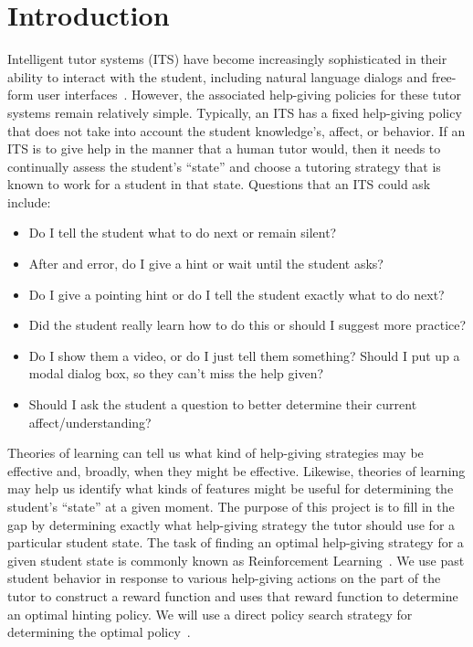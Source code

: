 \documentclass{edm_template}
\begin{document}
\section{Introduction}
 
Intelligent tutor systems (ITS) have become increasingly
sophisticated in their ability to interact with the student, including
natural language dialogs and free-form user interfaces~\cite{vanlehn_behavior_2006}.  However, the associated
help-giving policies for these tutor systems remain relatively simple.
Typically, an ITS has a fixed help-giving policy that does not take
into account the student knowledge's, affect, or behavior.
If an ITS is to give help in the manner that a human tutor would, then
it needs to continually assess the student's ``state'' and choose a tutoring strategy
that is known to work for a student in that state.
Questions that an ITS could ask include:
%
\label{intro}
\begin{itemize}

   \item Do I tell the student what to do next or remain silent?

   \item After and error, do I give a hint or wait until the student asks?

   \item Do I give a pointing hint or do I tell the student 
         exactly what to do next?

   \item Did the student really learn how to do this or should
         I suggest more practice?

   \item Do I show them a video, or do I just tell them something?
         Should I put up a modal dialog box, so they can't miss the
         help given?

   \item Should I ask the student a question to better determine their 
         current affect/understanding?

\end{itemize}

Theories of learning can tell us what kind of help-giving
strategies may be effective and, broadly, when they might be effective.
Likewise, theories of learning may help us identify what kinds of 
features might be useful for determining the student's ``state'' at
a given moment.  The purpose of this project is to fill in the gap
by determining exactly what help-giving strategy the tutor should use for a 
particular student state.
The task of finding an optimal help-giving strategy for a
given student state is commonly known as 
Reinforcement Learning~\cite{kaelbling_reinforcement_1996}.
We use past student behavior in response to various help-giving
actions on the part of the tutor to construct a reward function
and uses that reward function to determine an optimal hinting policy.
We will use a direct policy search strategy for determining the optimal
policy~\cite{rosenstein_robot_2001}.
\end{document}
